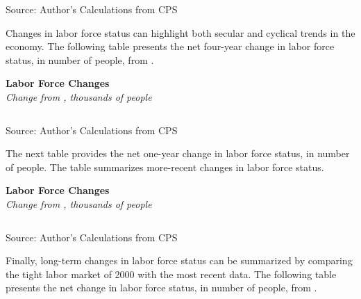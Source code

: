 \documentclass{report}
\begin{document}
{\begin{minipage}{1.0\textwidth}
\footnotesize{Source: Author's Calculations from CPS}
\vspace{4mm}

\small Changes in labor force status can highlight both secular and cyclical trends in the economy. The following table presents the net four-year change in labor force status, in number of people, from \unskip.
\vspace{1mm}

\normalsize \textbf{Labor Force Changes}\\
\footnotesize{\textit{Change from \unskip, thousands of people}}\\
\noindent {} \setlength{\tabcolsep}{3.0pt} \color{black!90}
		{\renewcommand{\arraystretch}{1.5}
\hspace*{-1mm} \begin{tabular}{p{28.5mm} R{11.2mm} R{10.4mm} R{10.4mm} R{10.2mm} 
		 				 R{10.6mm} R{10.4mm} R{10.4mm}}
			  \hline
		\end{tabular}}
		\vspace{-3mm}
		
\footnotesize{Source: Author's Calculations from CPS}
\end{minipage}
\newpage
\begin{minipage}{1.0\textwidth} \small The next table provides the net one-year change in labor force status, in number of people. The table summarizes more-recent changes in labor force status. 
\vspace{1mm}

\normalsize \textbf{Labor Force Changes}\\
\footnotesize{\textit{Change from \unskip, thousands of people}}\\
\noindent {} \setlength{\tabcolsep}{3.0pt} \color{black!90}
		{\renewcommand{\arraystretch}{1.5}
\hspace*{-1mm} \begin{tabular}{p{28.5mm} R{11.2mm} R{10.4mm} R{10.4mm} R{10.2mm} 
		 				 R{10.6mm} R{10.4mm} R{10.4mm}}
			  \hline
		\end{tabular}}
		\vspace{-3mm}
		
\footnotesize{Source: Author's Calculations from CPS}
\vspace{4mm}

\small Finally, long-term changes in labor force status can be summarized by comparing the tight labor market of 2000 with the most recent data. The following table presents the net change in labor force status, in number of people, from \unskip.
\vspace{1mm}


\end{minipage}}
\end{document}
